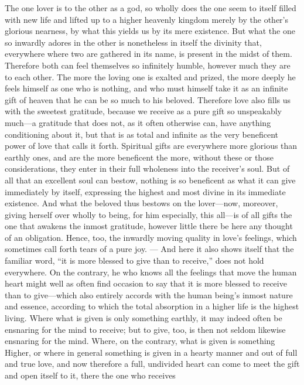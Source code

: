 \documentclass[12pt,a4paper]{book}
\begin{document}
The one lover is to the other as a god, so wholly does the one seem to
itself filled with new life and lifted up to a higher heavenly kingdom
merely by the other's glorious nearness, by what this yields us by its mere
existence. But what the one so inwardly adores in the other is nonetheless
in itself the divinity that, everywhere where two are gathered in its name,
is present in the midst of them. Therefore both can feel themselves so
infinitely humble, however much they are to each other. The more the
loving one is exalted and prized, the more deeply he feels himself as one
who is nothing, and who must himself take it as an infinite gift of heaven
that he can be so much to his beloved. Therefore love also fills us with
the sweetest gratitude, because we receive as a pure gift so unspeakably
much---a gratitude that does not, as it often otherwise can, have anything
conditioning about it, but that is as total and infinite as the very
beneficent power of love that calls it forth. Spiritual gifts are
everywhere more glorious than earthly ones, and are the more beneficent the
more, without these or those considerations, they enter in their full
wholeness into the receiver's soul. But of all that an excellent soul can
bestow, nothing is so beneficent as what it can give immediately by
itself, expressing the highest and most divine in its immediate existence.
And what the beloved thus bestows on the lover---now, moreover, giving
herself over wholly to being, for him especially, this all---is of all
gifts the one that awakens the inmost gratitude, however little there be
here any thought of an obligation. Hence, too, the inwardly moving quality
in love's feelings, which sometimes call forth tears of a pure joy. ---
And here it also shows itself that the familiar word, ``it is more blessed
to give than to receive,'' does not hold everywhere. On the contrary, he
who knows all the feelings that move the human heart might well as often
find occasion to say that it is more blessed to receive than to give---which
also entirely accords with the human being's inmost nature and essence,
according to which the total absorption in a higher life is the highest
living. Where what is given is only something earthly, it may indeed often
be ensnaring for the mind to receive; but to give, too, is then not seldom
likewise ensnaring for the mind. Where, on the contrary, what is given is
something Higher, or where in general something is given in a hearty manner
and out of full and true love, and now therefore a full, undivided heart
can come to meet the gift and open itself to it, there the one who receives
\end{document}
